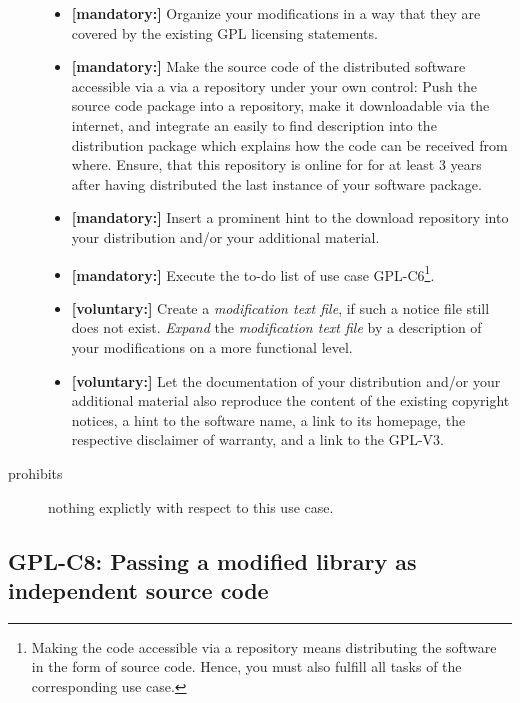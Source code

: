 \begin{description}
\begin{itemize}
  \item \textbf{[mandatory:]} Organize your modifications in a way that they are
  covered by the existing GPL licensing statements.
  
  \item \textbf{[mandatory:]} Make the source code of the distributed software
  accessible via a via a repository under your own control: Push the source code
  package into a repository, make it downloadable via the internet, and
  integrate an easily to find description into the distribution package which
  explains how the code can be received from where. Ensure, that this repository
  is online for for at least 3 years after having distributed the last instance
  of your software package.
  
  \item \textbf{[mandatory:]} Insert a prominent hint to the download repository
  into your distribution and/or your additional material.
  
  \item \textbf{[mandatory:]} Execute the to-do list of use case GPL-C6\footnote{
  Making the code accessible via a repository means distributing the software in
  the form of source code. Hence, you must also fulfill all tasks of the
  corresponding use case.}.

  
  \item \textbf{[voluntary:]} Create a \emph{modification text file}, if such a
  notice file still does not exist. \emph{Expand} the \emph{modification text
  file} by a description of your modifications on a more functional level.
      
  \item \textbf{[voluntary:]} Let the documentation of your distribution and/or
  your additional material also reproduce the content of the existing
  copyright notices, a hint to the software name, a link to its homepage,
  the respective disclaimer of warranty, and a link to the GPL-V3.


\end{itemize}

\item[prohibits] nothing explictly with respect to this use case.

\end{description}

\subsection{GPL-C8: Passing a modified library as independent source code}
\label{OSUC-08S-GPL}

